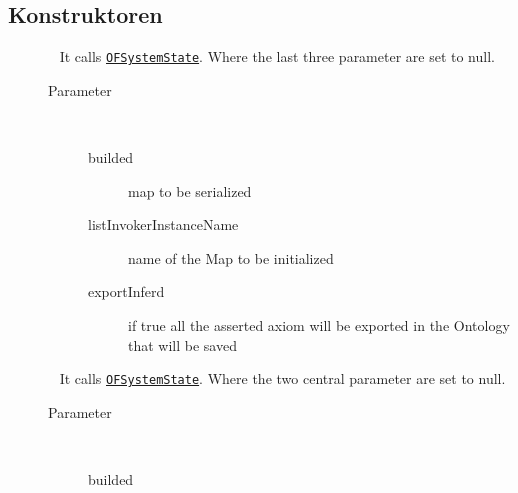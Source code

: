 \subsection{Konstruktoren}
\begin{description}
\item[{\label{ontologyFramework.OFRunning.OFSystemState(ontologyFramework.OFRunning.OFInvokingManager.OFBuildedListInvoker,java.lang.String,boolean)}}]
~ It calls \texttt{\hyperlink{ontologyFramework.OFRunning.OFSystemState(ontologyFramework.OFRunning.OFInvokingManager.OFBuildedListInvoker,java.lang.String,java.util.Set<java.lang.String>,java.util.Set<java.lang.String>,java.lang.String,boolean)}{OFSystemState}}. Where
 the last three parameter are set to null.
\begin{description}
\item[Parameter] ~
\begin{description}
\item[builded]
map to be serialized
\item[listInvokerInstanceName]
name of the Map to be initialized
\item[exportInferd]
if true all the asserted axiom will be exported in the Ontology that will be saved
\end{description}
\end{description}
\item[{\label{ontologyFramework.OFRunning.OFSystemState(ontologyFramework.OFRunning.OFInvokingManager.OFBuildedListInvoker,java.lang.String,java.lang.String,boolean)}}]
~ It calls \texttt{\hyperlink{ontologyFramework.OFRunning.OFSystemState(ontologyFramework.OFRunning.OFInvokingManager.OFBuildedListInvoker,java.lang.String,java.util.Set<java.lang.String>,java.util.Set<java.lang.String>,java.lang.String,boolean)}{OFSystemState}}. Where
 the two central parameter are set to null.
\begin{description}
\item[Parameter] ~
\begin{description}
\item[builded]

\end{description}
\end{description}
\end{description}
